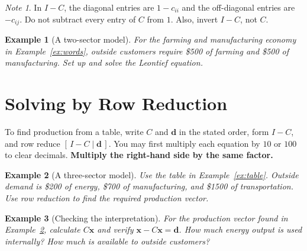 \documentclass{article}
\theoremstyle{plain}
\newtheorem{example}{Example}[section]
\theoremstyle{definition}
\theoremstyle{remark}
\newtheorem*{note}{Note}
\renewcommand{\vec}[1]{\mathbf{#1}}
\newcommand{\work}{\par\vfill}
\begin{document}
\begin{note}
In $I-C$, the diagonal entries are $1-c_{ii}$ and the off-diagonal entries are $-c_{ij}$. Do not subtract every entry of $C$ from $1$. Also, invert $I-C$, not $C$.
\end{note}


\newpage
\begin{example}[A two-sector model]\label{ex:two}
For the farming and manufacturing economy in Example~\ref{ex:words}, outside customers require \$500 of farming and \$500 of manufacturing. Set up and solve the Leontief equation.
\end{example}
\work

\newpage
\section{Solving by Row Reduction}
To find production from a table, write $C$ and $\vec{d}$ in the stated order, form $I-C$, and row reduce $[\,I-C\mid\vec{d}\,]$. You may first multiply each equation by $10$ or $100$ to clear decimals. \textbf{Multiply the right-hand side by the same factor.}

\begin{example}[A three-sector model]\label{ex:three}
Use the table in Example~\ref{ex:table}. Outside demand is \$200 of energy, \$700 of manufacturing, and \$1500 of transportation. Use row reduction to find the required production vector.
\end{example}
\work

\newpage
\begin{example}[Checking the interpretation]
For the production vector found in Example~\ref{ex:three}, calculate $C\vec{x}$ and verify $\vec{x}-C\vec{x}=\vec{d}$. How much energy output is used internally? How much is available to outside customers?
\end{example}
\work
\end{document}
